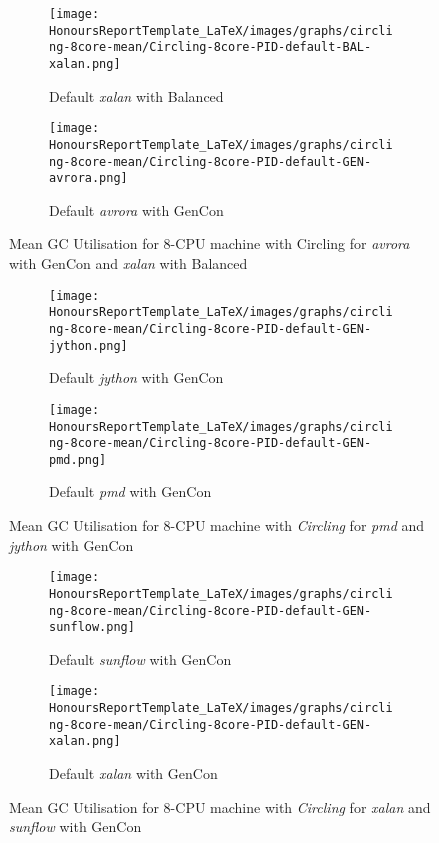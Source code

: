 \newpage
\begin{figure} [H]
 \begin{subfigure}{1\textwidth}
\texttt{[image: HonoursReportTemplate\_LaTeX/images/graphs/circling-8core-mean/Circling-8core-PID-default-BAL-xalan.png]}
\caption{Default \emph{xalan} with Balanced}
\label{fig:circling-mean-05}
\end{subfigure}
 \begin{subfigure}{1\textwidth}
\texttt{[image: HonoursReportTemplate\_LaTeX/images/graphs/circling-8core-mean/Circling-8core-PID-default-GEN-avrora.png]}
\caption{Default \emph{avrora} with GenCon}
\label{fig:circling-mean-06}
\end{subfigure}
\caption{Mean GC Utilisation for 8-CPU machine with Circling for \emph{avrora} with GenCon and \emph{xalan} with Balanced}
\end{figure}
\newpage
\begin{figure} [H]
 \begin{subfigure}{1\textwidth}
\texttt{[image: HonoursReportTemplate\_LaTeX/images/graphs/circling-8core-mean/Circling-8core-PID-default-GEN-jython.png]}
\caption{Default \emph{jython} with GenCon}
\label{fig:circling-mean-07}
\end{subfigure}
\begin{subfigure}{1\textwidth}
\texttt{[image: HonoursReportTemplate\_LaTeX/images/graphs/circling-8core-mean/Circling-8core-PID-default-GEN-pmd.png]}
\caption{Default \emph{pmd} with GenCon}
\label{fig:circling-mean-08}
\end{subfigure}
    \caption{Mean GC Utilisation for 8-CPU machine with \emph{Circling} for \emph{pmd} and \emph{jython} with GenCon}
    \label{fig:mean-GC-Util}
\end{figure}
\newpage
\begin{figure} [H]
\begin{subfigure}{1\textwidth}
\texttt{[image: HonoursReportTemplate\_LaTeX/images/graphs/circling-8core-mean/Circling-8core-PID-default-GEN-sunflow.png]}
\caption{Default \emph{sunflow} with GenCon}
\label{fig:circling-mean-9}
\end{subfigure}
\begin{subfigure}{1\textwidth}
\texttt{[image: HonoursReportTemplate\_LaTeX/images/graphs/circling-8core-mean/Circling-8core-PID-default-GEN-xalan.png]}
\caption{Default \emph{xalan} with GenCon}
\label{fig:circling-mean-10}
\end{subfigure}
\caption{Mean GC Utilisation for 8-CPU machine with \emph{Circling} for \emph{xalan} and \emph{sunflow} with GenCon}
\end{figure}
